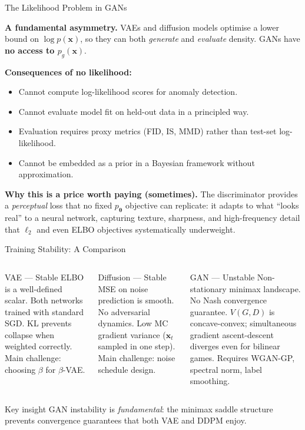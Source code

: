 \documentclass[aspectratio=169,11pt]{beamer}
\newcommand{\bx}{\bm{x}}
\newcommand{\btheta}{\bm{\theta}}
\begin{document}
\begin{frame}{The Likelihood Problem in GANs}

\textbf{A fundamental asymmetry.}
VAEs and diffusion models optimise a lower bound on $\log p(\bx)$,
so they can both \emph{generate} and \emph{evaluate} density.
GANs have \textbf{no access to $p_g(\bx)$}.

\medskip
\textbf{Consequences of no likelihood:}
\begin{itemize}
  \item Cannot compute log-likelihood scores for anomaly detection.
  \item Cannot evaluate model fit on held-out data in a principled way.
  \item Evaluation requires proxy metrics (FID, IS, MMD) rather than
        test-set log-likelihood.
  \item Cannot be embedded as a prior in a Bayesian framework without
        approximation.
\end{itemize}

\medskip
\textbf{Why this is a price worth paying (sometimes).}
The discriminator provides a \emph{perceptual} loss that no fixed
$p_{\btheta}$ objective can replicate: it adapts to what ``looks real''
to a neural network, capturing texture, sharpness, and high-frequency detail
that $\ell_2$ and even ELBO objectives systematically underweight.
\end{frame}

\begin{frame}{Training Stability: A Comparison}
\footnotesize
\begin{columns}[T]
\begin{block}{VAE — Stable}
ELBO is a well-defined scalar.
Both networks trained with standard SGD.
KL prevents collapse when weighted correctly.
Main challenge: choosing $\beta$ for $\beta$-VAE.
\end{block}

\begin{block}{Diffusion — Stable}
MSE on noise prediction is smooth.
No adversarial dynamics.
Low MC gradient variance ($\bx_t$ sampled in one step).
Main challenge: noise schedule design.
\end{block}

\begin{block}{GAN — Unstable}
Non-stationary minimax landscape.
No Nash convergence guarantee.
$V(G,D)$ is concave-convex; simultaneous gradient ascent-descent
diverges even for bilinear games.
Requires WGAN-GP, spectral norm, label smoothing.
\end{block}
\end{columns}

\smallskip
\begin{alertblock}{Key insight}
GAN instability is \emph{fundamental}: the minimax saddle structure prevents
convergence guarantees that both VAE and DDPM enjoy.
\end{alertblock}
\end{frame}
\end{document}
